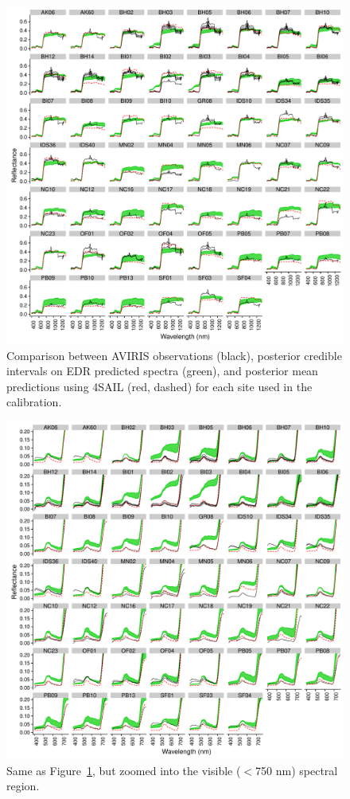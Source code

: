 \begin{figure}
  \centering
  \includegraphics[width=\textwidth]{4_edr/figures/explore_spectra/errors_all.pdf}
  \caption{%
    Comparison between AVIRIS observations (black), posterior credible intervals on EDR predicted spectra (green), and posterior mean predictions using 4SAIL (red, dashed) for each site used in the calibration.
  }\label{fig:spec_error_all}
\end{figure}

\begin{figure}
  \centering
  \includegraphics[width=\textwidth]{4_edr/figures/explore_spectra/errors_vis.pdf}
  \caption{%
    Same as Figure~\ref{fig:spec_error_all}, but zoomed into the visible ($<$750 nm) spectral region.
  }\label{fig:spec_error_vis}
\end{figure}

